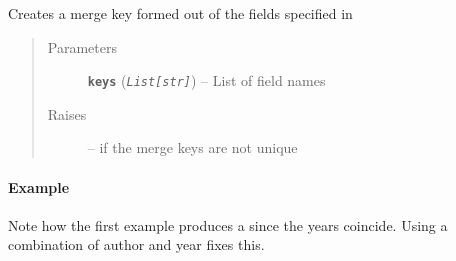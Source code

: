 \documentclass[letterpaper,10pt,english]{sphinxmanual}
\begin{document}
\begin{fulllineitems}

\begin{fulllineitems}
\label{modules/pybibtools:listb.pybibtools.Bibliography.make_key}
Creates a merge key formed out of the fields specified
in 
\begin{quote}\begin{description}
\item[{Parameters}] \leavevmode
\textbf{\texttt{keys}} (\emph{\texttt{List{[}str{]}}}) -- List of field names

\item[{Raises}] \leavevmode
{} -- if the merge keys are not unique

\end{description}\end{quote}
\paragraph{Example}

Note how the first example produces a  since
the years coincide. Using a combination of author and year
fixes this.


\end{fulllineitems}
\end{fulllineitems}
\end{document}
